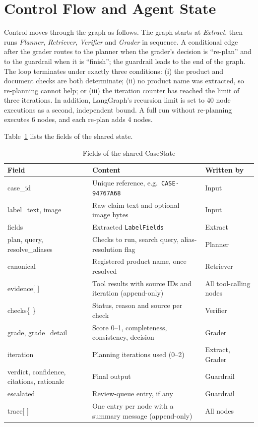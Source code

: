 \section{Control Flow and Agent State}

Control moves through the graph as follows. The graph starts at \emph{Extract}, then runs
\emph{Planner}, \emph{Retriever}, \emph{Verifier} and \emph{Grader} in sequence. A conditional edge
after the grader routes to the planner when the grader's decision is ``re-plan'' and to the guardrail
when it is ``finish''; the guardrail leads to the end of the graph. The loop terminates under exactly
three conditions: (i) the product and document checks are both determinate; (ii) no product name was
extracted, so re-planning cannot help; or (iii) the iteration counter has reached the limit of three
iterations. In addition, LangGraph's recursion limit is set to 40 node executions as a second,
independent bound. A full run without re-planning executes 6 nodes, and each re-plan adds 4 nodes.

Table~\ref{tab:state} lists the fields of the shared state.

\begin{table}[H]
\centering
\caption{Fields of the shared CaseState}
\label{tab:state}
\small
\begin{tabularx}{\linewidth}{@{}>{\ttfamily}l >{\raggedright\arraybackslash}X >{\raggedright\arraybackslash}p{2.6cm}@{}}
\toprule
\normalfont\textbf{Field} & \textbf{Content} & \textbf{Written by} \\ \midrule
case\_id & Unique reference, e.g.\ \texttt{CASE-94767A68} & Input \\
label\_text, image & Raw claim text and optional image bytes & Input \\
fields & Extracted \texttt{LabelFields} & Extract \\
plan, query, resolve\_aliases & Checks to run, search query, alias-resolution flag & Planner \\
canonical & Registered product name, once resolved & Retriever \\
evidence[ ] & Tool results with source IDs and iteration (append-only) & All tool-calling nodes \\
checks\{ \} & Status, reason and source per check & Verifier \\
grade, grade\_detail & Score 0--1, completeness, consistency, decision & Grader \\
iteration & Planning iterations used (0--2) & Extract, Grader \\
verdict, confidence, citations, rationale & Final output & Guardrail \\
escalated & Review-queue entry, if any & Guardrail \\
trace[ ] & One entry per node with a summary message (append-only) & All nodes \\
\bottomrule
\end{tabularx}
\end{table}

